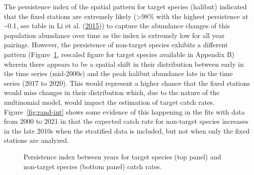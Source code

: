 \documentclass[12pt]{article}\usepackage[]{graphicx}\usepackage[]{color}
\begin{document}
The persistence index of the spatial pattern for target species (halibut) indicated that the fixed stations are extremely likely (\textgreater98\% with the highest persistence at \textasciitilde0.1, see table in Li et al. (\protect\hyperlink{ref-Li2015}{2015})) to capture the abundance changes of this population abundance over time as the index is extremely low for all year pairings. However, the persistence of non-target species exhibits a different pattern (Figure~\ref{fig:persist}, rescaled figure for target species available in Appendix B) wherein there appears to be a spatial shift in their distribution between early in the time series (mid-2000s) and the peak halibut abundance late in the time series (2017 to 2020). This would represent a higher chance that the fixed stations would miss changes in their distribution which, due to the nature of the multinomial model, would impact the estimation of target catch rates. Figure~\ref{fig:rand-int} shows some evidence of this happening in the fits with data from 2000 to 2021 in that the expected catch rate for non-target species increases in the late 2010s when the stratified data is included, but not when only the fixed stations are analyzed.
\begin{figure}[htb]

{\centering {}  

}

\caption{Persistence index between years for target species (top panel) and non-target species (bottom panel) catch rates.}\label{fig:persist}
\end{figure}
\end{document}
